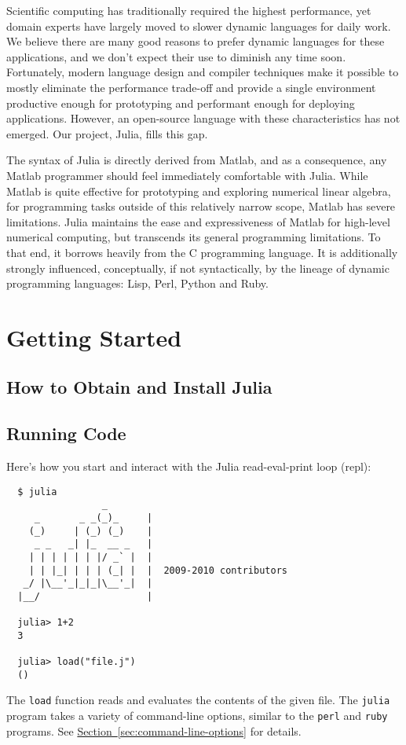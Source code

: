 \documentclass{article}
\title{\thetitle}
\author{
Jeff Bezanson \vspace{0.5em}\\
Stefan Karpinski \vspace{0.5em}\\
Viral Shah \vspace{0.5em}
}
\renewcommand{\sec}[1]{\label{sec:#1}}
\newcommand{\Section}[1]{\hyperref[sec:#1]{Section~\ref*{sec:#1}}}
\begin{document}
\maketitle

Scientific computing has traditionally required the highest performance, yet domain experts have largely moved to slower dynamic languages for daily work.
We believe there are many good reasons to prefer dynamic languages for these applications, and we don't expect their use to diminish any time soon.
Fortunately, modern language design and compiler techniques make it possible to mostly eliminate the performance trade-off and provide a single environment productive enough for prototyping and performant enough for deploying applications.
However, an open-source language with these characteristics has not emerged.
Our project, Julia, fills this gap.

The syntax of Julia is directly derived from Matlab, and as a consequence, any Matlab programmer should feel immediately comfortable with Julia.
While Matlab is quite effective for prototyping and exploring numerical linear algebra, for programming tasks outside of this relatively narrow scope, Matlab has severe limitations.
Julia maintains the ease and expressiveness of Matlab for high-level numerical computing, but transcends its general programming limitations.
To that end, it borrows heavily from the C programming language.
It is additionally strongly influenced, conceptually, if not syntactically, by the lineage of dynamic programming languages:
Lisp, Perl, Python and Ruby.

\section{Getting Started}
\sec{getting-started}

\subsection{How to Obtain and Install Julia}
\sec{obtaining-and-installing}

\subsection{Running Code}
\sec{running-code}

Here's how you start and interact with the Julia read-eval-print loop (repl):

\begin{verbatim}
  $ julia
                 _      
     _       _ _(_)_     |
    (_)     | (_) (_)    |  
     _ _   _| |_  __ _   |
    | | | | | | |/ _` |  |
    | | |_| | | | (_| |  |  2009-2010 contributors
   _/ |\__'_|_|_|\__'_|  |  
  |__/                   |

  julia> 1+2
  3

  julia> load("file.j")
  ()
\end{verbatim}
The \verb|load| function reads and evaluates the contents of the given file.
The \verb|julia| program takes a variety of command-line options, similar to the \verb|perl| and \verb|ruby| programs.
See \Section{command-line-options} for details.
\end{document}

